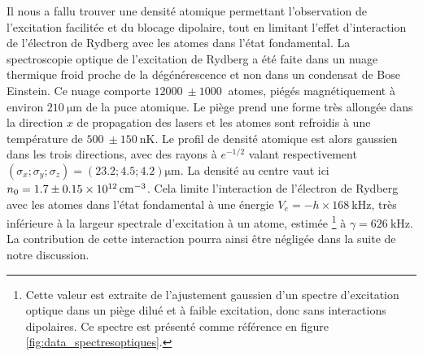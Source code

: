 Il nous a fallu trouver une densité atomique permettant l'observation de l'excitation facilitée et du blocage dipolaire, tout en limitant l'effet d'interaction de l'électron de Rydberg avec les atomes dans l'état fondamental.
La spectroscopie optique de l'excitation de Rydberg a été faite dans un nuage thermique froid proche de la dégénérescence et non dans un condensat de Bose Einstein.
Ce nuage comporte $\SI{12000}{} \pm \SI{1000}{}$ atomes, piégés magnétiquement à environ $\SI{210}{\um}$ de la puce atomique.
Le piège prend une forme très allongée dans la direction $x$ de propagation des lasers et les atomes sont refroidis à une température de $\SI{500}{} \pm \SI{150}{\nano\kelvin}$.
Le profil de densité atomique est alors gaussien dans les trois directions, avec des rayons à $e^{-1/2}$ valant respectivement $(\sigma_x;\sigma_y;\sigma_z) = (\num{23.2} ; \num{4.5} ; \num{4.2})\si{\um}$.
La densité au centre vaut ici $n_0 = \num{1.7}\pm\SI{0.15e12}{\per\raiseto{3}\cm}$.
Cela limite l'interaction de l'électron de Rydberg avec les atomes dans l'état fondamental à une énergie $V_e = -h\times\SI{168}{\kHz}$, très inférieure à la largeur spectrale d'excitation à un atome, estimée \footnote{
Cette valeur est extraite de l'ajustement gaussien d'un spectre d'excitation optique dans un piège dilué et à faible excitation, donc sans interactions dipolaires.
Ce spectre est présenté comme référence en figure \eqref{fig:data_spectresoptiques}.}
à $\gamma = \SI{626}{\kHz}$.
La contribution de cette interaction pourra ainsi être négligée dans la suite de notre discussion.


